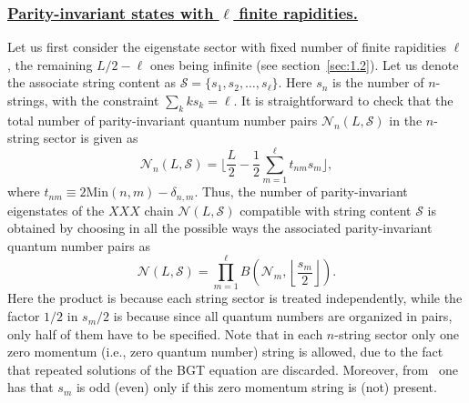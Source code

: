 \documentclass[11pt]{iopart}
\begin{document}
\subsubsection{\underline{Parity-invariant states with $\ell$ finite rapidities.}}
\label{app-1.1}

Let us first consider the eigenstate sector with fixed number of finite rapidities 
$\ell$, the remaining $L/2-\ell$ ones being infinite (see section~\ref{sec:1.2}). 
Let us denote the associate string content as ${\mathcal S}=\{s_1,s_2,\dots,
s_{\ell}\}$. Here $s_n$ is the number of $n$-strings, with the constraint 
$\sum_k ks_k=\ell$. 
It is straightforward to check that 
the total number of parity-invariant quantum number pairs ${\mathcal N}_n(L,{
\mathcal S})$ in the $n$-string sector is given as 
%
\begin{equation}
\label{NnLS}
{\mathcal N}_n(L,{\mathcal S})=\Big\lfloor\frac{L}{2}-\frac{1}{2}
\sum_{m=1}^{\ell}t_{nm}s_m\Big\rfloor,
\end{equation}
%
where $t_{nm}\equiv 2\textrm{Min}(n,m)-\delta_{n,m}$. Thus, the number of parity-invariant 
eigenstates of the $XXX$ chain ${\mathcal N}(L,{\mathcal S})$ compatible with string content 
${\mathcal S}$ is obtained by choosing in all the possible ways the associated parity-invariant 
quantum number pairs as     
%
\begin{equation}
\label{NLS}
{\mathcal N}(L,{\mathcal S})=\prod_{m=1}^{\ell} B\left({\mathcal N}_m,\left\lfloor
\frac{s_m}{2}\right\rfloor\right).
\end{equation}
%
Here the product is because each string sector is treated independently, while the 
factor $1/2$ in $s_m/2$ is because since all quantum numbers are organized in pairs, 
only half of them have to be specified. Note that in each $n$-string sector only one 
zero momentum (i.e., zero quantum number) string is allowed, due to the fact that 
repeated solutions of the BGT equation are discarded. Moreover, from~ one has 
that $s_m$ is odd (even) only if this zero momentum string is (not) present. 
\end{document}
